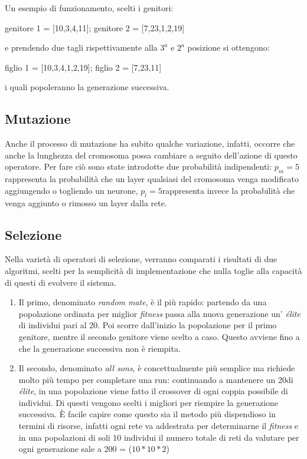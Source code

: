 \documentclass[12pt,a4paper]{report}
\begin{document}
Un esempio di funzionamento, scelti i genitori:

\begin{center}
 genitore 1 = [10,3,4,11];  genitore 2 = [7,23,1,2,19]\\
\end{center}

e prendendo due tagli rispettivamente alla $3^{a}$ e $2^{a}$ posizione si ottengono:

\begin{center}
 figlio 1 = [10,3,4,1,2,19]; figlio 2 = [7,23,11]
\end{center}

i quali popoleranno la generazione successiva.

\subsection{Mutazione}

Anche il processo di mutazione ha subito qualche variazione, infatti, occorre che anche la lunghezza del cromosoma possa cambiare a seguito dell'azione di questo operatore.
Per fare ciò sono state introdotte due probabilità indipendenti: $p_{m} = 5$\textdiscount \text{ }rappresenta la probabilità che un layer qualsiasi del cromosoma venga modificato aggiungendo o togliendo un neurone, $p_{l} = 5$\textdiscount \text{ }rappresenta invece la probabilità che venga aggiunto o rimosso un layer dalla rete.

\subsection{Selezione}

Nella varietà di operatori di selezione, verranno comparati i risultati di due algoritmi, scelti per la semplicità di implementazione che nulla toglie alla capacità di questi di evolvere il sistema.

\begin{enumerate}
 \item Il primo, denominato \textit{random mate}, è il più rapido: partendo da una popolazione ordinata per miglior \textit{fitness} passa alla nuova generazione un' \textit{élite} di individui pari al 20\textdiscount.
 Poi scorre dall'inizio la popolazione per il primo genitore, mentre il secondo genitore viene scelto a caso. 
 Questo avviene fino a che la generazione successiva non è riempita.
 
 \item Il secondo, denominato \textit{all sons}, è concettualmente più semplice ma richiede molto più tempo per completare una run: continuando a mantenere un 20\textdiscount di \textit{élite}, in una popolazione viene fatto il crossover di ogni coppia possibile di individui.
 Di questi vengono scelti i migliori per riempire la generazione successiva.
 È facile capire come questo sia il metodo più dispendioso in termini di risorse, infatti ogni rete va addestrata per determinarne il \textit{fitness} e in una popolazioni di soli 10 individui il numero totale di reti da valutare per ogni generazione sale a 200 =  ($10*10*2$)
 
\end{enumerate}
\end{document}
